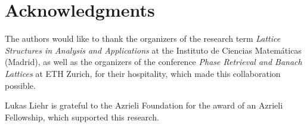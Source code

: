 \documentclass[reqno,a4paper,11pt]{amsart}
\numberwithin{equation}{section}
\newcommand\1{\mathds{1}}
\begin{document}





\section*{Acknowledgments}

The authors would like to thank the organizers of the research term \textit{Lattice Structures in Analysis and Applications} at the Instituto de Ciencias Matemáticas (Madrid), as well as the organizers of the conference \textit{Phase Retrieval and Banach Lattices} at ETH Zurich, for their hospitality, which made this collaboration possible.

Lukas Liehr is grateful to the Azrieli Foundation for the award of an Azrieli Fellowship, which supported this research. 



\end{document}
